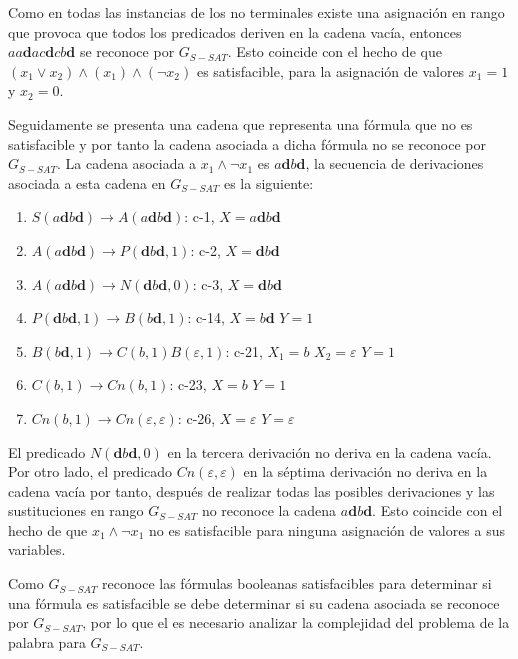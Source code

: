Como en todas las instancias de los no terminales existe una asignación en rango que provoca que todos los predicados deriven en la cadena vacía, entonces $aa\mathbf{d}ac\mathbf{d}cb\mathbf{d}$ se reconoce por $G_{S-SAT}$. Esto coincide con el hecho de que $(x_1 \vee x_2) \wedge (x_1) \wedge (\neg x_2)$ es satisfacible, para la asignación de valores $x_1=1$ y $x_2=0$.

Seguidamente se presenta una cadena que representa una fórmula que no es satisfacible y por tanto la cadena asociada
a dicha fórmula no se reconoce por $G_{S-SAT}$. La cadena asociada a $x_1 \wedge \neg x_1$ es $a\mathbf{d}b\mathbf{d}$,
la secuencia de derivaciones asociada a esta cadena en $G_{S-SAT}$ es la siguiente:

\begin{enumerate}
    \item $S(a\mathbf{d}b\mathbf{d})\to A(a\mathbf{d}b\mathbf{d})$: c-1, $X=a\mathbf{d}b\mathbf{d}$
    \item $A(a\mathbf{d}b\mathbf{d})\to P(\mathbf{d}b\mathbf{d},1)$: c-2, $X=\mathbf{d}b\mathbf{d}$
    \item $A(a\mathbf{d}b\mathbf{d})\to N(\mathbf{d}b\mathbf{d},0)$: c-3, $X=\mathbf{d}b\mathbf{d}$
    \item $P(\mathbf{d}b\mathbf{d},1) \to B(b\mathbf{d},1)$: c-14, $X=b\mathbf{d}$ $Y=1$
    \item $B(b\mathbf{d},1)\to C(b,1) B(\varepsilon,1)$: c-21, $X_1=b$ $X_2=\varepsilon$ $Y=1$
    \item $C(b,1)\to Cn(b,1)$: c-23, $X=b$ $Y=1$
    \item $Cn(b,1)\to Cn(\varepsilon,\varepsilon)$: c-26, $X=\varepsilon$ $Y=\varepsilon$
\end{enumerate}


El predicado $N(\mathbf{d}b\mathbf{d},0)$ en la tercera derivación no deriva en la cadena vacía. Por otro lado, el predicado $Cn(\varepsilon,\varepsilon)$ en la séptima derivación no deriva en la cadena vacía por tanto, después de realizar todas las posibles derivaciones y las sustituciones en rango $G_{S-SAT}$ no reconoce la cadena $a\mathbf{d}b\mathbf{d}$.  Esto coincide con el hecho de que $x_1 \wedge \neg x_1$ no es satisfacible para ninguna asignación de valores a sus variables.


Como $G_{S-SAT}$ reconoce las fórmulas booleanas satisfacibles para determinar si una fórmula es satisfacible se debe determinar si su cadena asociada se reconoce por $G_{S-SAT}$, por lo que el es necesario analizar la complejidad del problema de la palabra para $G_{S-SAT}$.

